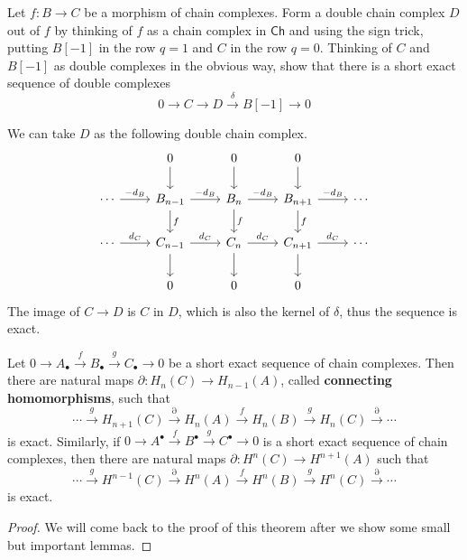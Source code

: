 \begin{exer} Let $f:B\rightarrow C$ be a morphism of chain complexes. Form a double chain complex $D$ out of $f$ by thinking of $f$ as a chain complex in $\mathsf{Ch}$ and using the sign trick, putting $B[-1]$ in the row $q=1$ and $C$ in the row $q=0$. Thinking of $C$ and $B[-1]$ as double complexes in the obvious way, show that there is a short exact sequence of double complexes
\begin{equation}
0\rightarrow C\rightarrow D\xrightarrow{\delta} B[-1]\rightarrow 0
\end{equation}
\end{exer}
\begin{solution}
We can take $D$ as the following double chain complex.
\begin{equation}
\begin{tikzcd}
&0\arrow[d]&0\arrow[d]&0\arrow[d]&\\
\cdots\arrow{r}{-d_B}&B_{n-1}\arrow{r}{-d_{B}}\arrow{d}{f}&B_{n}\arrow{r}{-d_{B}}\arrow{d}{f}&B_{n+1}\arrow{r}{-d_B}\arrow{d}{f}&\cdots\\
\cdots\arrow{r}{d_C}&C_{n-1}\arrow{r}{d_C}\arrow{d}&C_{n}\arrow{r}{d_C}\arrow{d}&C_{n+1}\arrow{r}{d_C}\arrow{d}&\cdots\\
&0&0&0&
\end{tikzcd}
\end{equation}
The image of $C\rightarrow D$ is $C$ in $D$, which is also the kernel of $\delta$, thus the sequence is exact.
\end{solution}

\begin{thm} Let $0\rightarrow A_\bullet\xrightarrow{f} B_\bullet\xrightarrow{g} C_\bullet\rightarrow 0$ be a short exact sequence of chain complexes. Then there are natural maps $\partial:H_n(C)\rightarrow H_{n-1}(A)$, called \textbf{connecting homomorphisms}, such that
\begin{equation}
\cdots\xrightarrow{g}H_{n+1}(C)\xrightarrow{\partial}H_n(A)\xrightarrow{f}H_n(B)\xrightarrow{g}H_n(C)\xrightarrow{\partial}\cdots
\end{equation}
is exact. Similarly, if $0\rightarrow A^\bullet\xrightarrow{f} B^\bullet\xrightarrow{g} C^\bullet\rightarrow 0$ is a short exact sequence of chain complexes, then there are natural maps $\partial:H^n(C)\rightarrow H^{n+1}(A)$ such that
\begin{equation}
\cdots\xrightarrow{g}H^{n-1}(C)\xrightarrow{\partial}H^n(A)\xrightarrow{f}H^n(B)\xrightarrow{g}H^n(C)\xrightarrow{\partial}\cdots
\end{equation}
is exact.
\end{thm}
\begin{proof} We will come back to the proof of this theorem after we show some small but important lemmas.
\end{proof}

